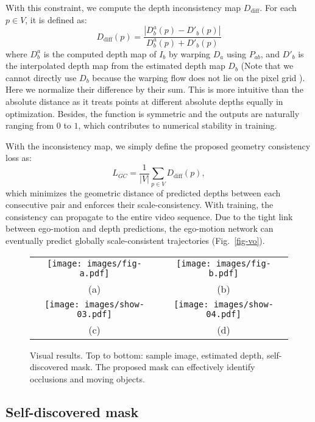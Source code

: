 \documentclass{article}
\newcommand{\figref}[1]{Fig.~\ref{#1}}
\begin{document}
With this constraint, we compute the depth inconsistency map $D_{\text{diff}}$.
For each $p \in V$, it is defined as:
\begin{equation}\label{eqn-depthdiff}
D_{\text{diff}}(p) = \frac{|D_b^{a}(p) - D'_b(p)|}{D_b^{a}(p) + D'_b(p)}
\end{equation}
where $D_b^{a}$ is the computed depth map of $I_b$ by warping $D_a$ using $P_{ab}$,
and  $D'_b$ is the interpolated depth map from the estimated depth map $D_b$ (Note that we cannot directly use $D_b$ because the warping flow does not lie on the pixel grid ).
Here we normalize their difference by their sum.
This is more intuitive than the absolute distance as it treats points at different absolute depths equally in optimization.
Besides, the function is symmetric and the outputs are naturally ranging from $0$ to $1$, which contributes to numerical stability in training.

With the inconsistency map, we simply define the proposed geometry consistency loss as:
\begin{equation}\label{eqn-gc}
L_{GC} = \frac{1}{|V|} \sum_{p \in V} D_{\text{diff}}(p),
\end{equation}
which minimizes the geometric distance of predicted depths between each consecutive pair and enforces their scale-consistency.
With training, the consistency can propagate to the entire video sequence.
Due to the tight link between ego-motion and depth predictions, the ego-motion network can eventually predict globally scale-consistent trajectories (\figref{fig-vo}).


\begin{figure}[t]
\centering
\begin{tabular}{cc}
\texttt{[image: images/fig-a.pdf]}& 
\texttt{[image: images/fig-b.pdf]}\\
(a)  & (b) \\
\texttt{[image: images/show-03.pdf]}& 
\texttt{[image: images/show-04.pdf]}\\
(c) & (d) \\
\end{tabular}
\caption{Visual results. Top to bottom: sample image, estimated depth, self-discovered mask.
The proposed mask can effectively identify occlusions and moving objects.}
\label{fig-show}
 \vspace{-2mm}
\end{figure}

\subsection{Self-discovered mask}\label{sec-mask}
\end{document}
